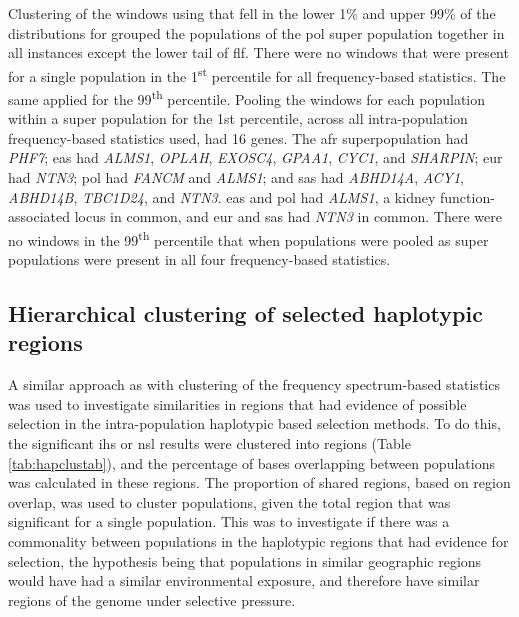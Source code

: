\documentclass[]{report}
\begin{document}
Clustering of the windows using that fell in the lower 1\% and upper
99\% of the distributions for grouped the populations of the \gls{pol}
super population together in all instances except the lower tail of
\gls{flf}. There were no windows that were present for a single
population in the 1\textsuperscript{st} percentile for all
frequency-based statistics. The same applied for the
99\textsuperscript{th} percentile. Pooling the windows for each
population within a super population for the 1st percentile, across all
intra-population frequency-based statistics used, had 16 genes. The
\gls{afr} superpopulation had \emph{PHF7}; \gls{eas} had \emph{ALMS1},
\emph{OPLAH}, \emph{EXOSC4}, \emph{GPAA1}, \emph{CYC1}, and
\emph{SHARPIN}; \gls{eur} had \emph{NTN3}; \gls{pol} had \emph{FANCM}
and \emph{ALMS1}; and \gls{sas} had \emph{ABHD14A}, \emph{ACY1},
\emph{ABHD14B}, \emph{TBC1D24}, and \emph{NTN3}. \gls{eas} and \gls{pol}
had \emph{ALMS1}, a kidney function-associated locus
\citep{pattaro2016genetic} in common, and \gls{eur} and \gls{sas} had
\emph{NTN3} in common. There were no windows in the
99\textsuperscript{th} percentile that when populations were pooled as
super populations were present in all four frequency-based statistics.

\FloatBarrier

\subsection{Hierarchical clustering of selected haplotypic
regions}\label{hierarchical-clustering-of-selected-haplotypic-regions}

A similar approach as with clustering of the frequency spectrum-based
statistics was used to investigate similarities in regions that had
evidence of possible selection in the intra-population haplotypic based
selection methods. To do this, the significant \gls{ihs} or \gls{nsl}
results were clustered into regions (Table \ref{tab:hapclustab}), and
the percentage of bases overlapping between populations was calculated
in these regions. The proportion of shared regions, based on region
overlap, was used to cluster populations, given the total region that
was significant for a single population. This was to investigate if
there was a commonality between populations in the haplotypic regions
that had evidence for selection, the hypothesis being that populations
in similar geographic regions would have had a similar environmental
exposure, and therefore have similar regions of the genome under
selective pressure.
\end{document}
